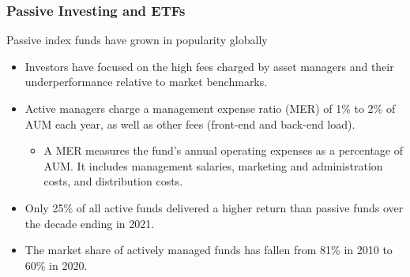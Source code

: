 \documentclass[aspectratio=169]{beamer}
\begin{document}
\begin{frame}
\frametitle{Passive Investing and ETFs}

\vspace{-2mm}
Passive index funds have grown in popularity globally 

\vspace{-2mm}
\begin{itemize}
    \item Investors have focused on the high fees charged by asset managers and their underperformance relative to market benchmarks.
    

    \item Active managers charge a management expense ratio (MER) of 1\% to 2\% of AUM each year, as well as other fees (front-end and back-end load).
    
    \begin{itemize}
        \item A MER measures the fund’s annual operating expenses as a percentage of AUM. It includes management salaries, marketing and administration costs, and distribution costs.
    \end{itemize}

    \item Only 25\% of all active funds delivered a higher return than passive funds over the decade ending in 2021.

    \item The market share of actively managed funds has fallen from 81\% in 2010 to 60\% in 2020.
\end{itemize}



\end{frame} 
\end{document}
